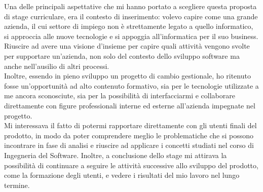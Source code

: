 Una delle principali aspettative che mi hanno portato a scegliere questa proposta di stage
curriculare, era il contesto di inserimento: volevo capire come una grande azienda, il cui settore di impiego non è strettamente legato a quello informatico, si approccia alle nuove tecnologie e si appoggia all'informatica per il suo business.
Riuscire ad avere una visione d'insieme per capire quali attività vengono svolte per supportare un'azienda, non solo del contesto dello sviluppo software ma anche nell'ausilio di altri processi.\\ Inoltre, essendo in pieno sviluppo un progetto di cambio gestionale, ho ritenuto fosse un'opportunità ad alto contenuto formativo, sia per le tecnologie utilizzate a me ancora sconosciute, sia per la possibilità di interfacciarmi e collaborare direttamente con figure professionali interne ed esterne all'azienda impegnate nel progetto.\\
Mi interessava il fatto di potermi rapportare direttamente con gli utenti finali del prodotto, in modo da poter comprendere meglio le problematiche che si possono incontrare in fase di analisi e riuscire ad applicare i concetti studiati nel corso di Ingegneria del Software.
Inoltre, a conclusione dello stage mi attirava la possibilità di continuare a seguire le attività successive allo sviluppo del prodotto, come la formazione degli utenti, e vedere i risultati del mio lavoro nel lungo termine.
